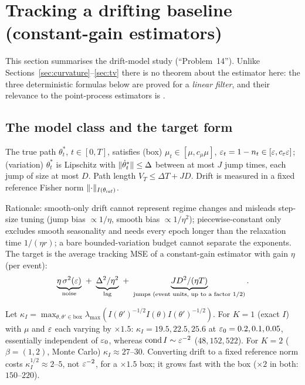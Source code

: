 \section{Tracking a drifting baseline (constant-gain estimators)}\label{sec:tracking}

This section summarises the drift-model study (``Problem~14''). Unlike Sections~\ref{sec:curvature}--\ref{sec:tv} there is no theorem about the
estimator here: the three deterministic formulas below are proved for a \emph{linear filter}, and their relevance to the point-process
estimators is \Nt{}.

\subsection{The model class and the target form}

\begin{definition}\label{def:drift}
The true path $\theta^*_t$, $t\in[0,T]$, satisfies (box) $\mu_t\in[\mu,c_\mu\mu]$, $\varepsilon_t=1-n_t\in[\varepsilon,c_\varepsilon\varepsilon]$; (variation) $\theta^*_t$ is Lipschitz with $\lVert \dot\theta^*_t\rVert\le\Delta$ between at most $J$ jump times, each jump of size at most $D$. Path length $V_T\le\Delta T+JD$. Drift is measured in a fixed reference Fisher norm $\lVert \cdot\rVert_{I(\theta_{\mathrm{ref}})}$.
\end{definition}
Rationale: smooth-only drift cannot represent regime changes and misleads step-size tuning (jump bias $\propto1/\eta$, smooth bias $\propto1/\eta^2$); piecewise-constant only excludes smooth seasonality and needs every epoch longer than the relaxation time $1/(\eta r)$; a bare bounded-variation budget cannot separate the exponents.
The target is the average tracking MSE of a constant-gain estimator with gain $\eta$ (per event):
\[
\underbrace{\eta\,\sigma^2(\eps)}_{\text{noise}}\ +\ \underbrace{\Delta^2/\eta^2}_{\text{lag}}\ +\ \underbrace{J D^2/(\eta T)}_{\text{jumps (event units, up to a factor }1/2)} .
\]

\begin{proposition}\label{prop:metric}\Nt{}
Let $\kappa_I=\max_{\theta,\theta'\in\text{box}}\lambda_{\max}(I(\theta')^{-1/2}I(\theta)I(\theta')^{-1/2})$. For $K=1$ (exact $I$) with $\mu$ and $\varepsilon$ each varying by $\times1.5$: $\kappa_I=19.5,22.5,25.6$ at $\varepsilon_0=0.2,0.1,0.05$, essentially independent of $\varepsilon_0$, whereas $\mathrm{cond}\,I\sim\varepsilon^{-2}$ ($48,152,522$). For $K=2$ ($\beta=(1,2)$, Monte Carlo) $\kappa_I\approx27$--$30$. Converting drift to a fixed reference norm costs $\kappa_I^{1/2}\approx2$--$5$, not $\varepsilon^{-2}$, for a $\times1.5$ box; it grows fast with the box ($\times2$ in both: $150$--$220$).
\end{proposition}

